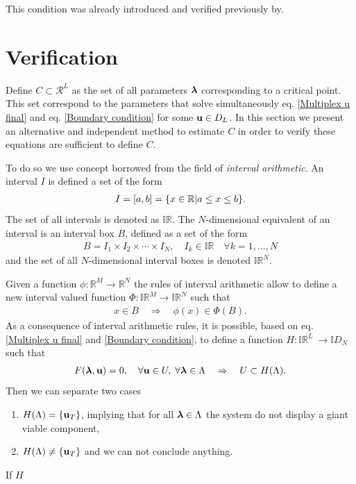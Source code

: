 \documentclass[a4paper]{article}
\begin{document}
This condition was already introduced and verified previously by\missingref{}.

\section{Verification}

Define $C \subset \mathcal{R}^L$ as the set of all parameters $\boldsymbol{\mathrm{\lambda}}$ corresponding to a critical point. This set correspond to the parameters that solve simultaneously eq. \eqref{Multiplex u final} and eq. \eqref{Boundary condition} for some $\boldsymbol{\mathrm{u}} \in D_L$. In this section we present an alternative and independent method to estimate $C$ in order to verify these equations are sufficient to define $C$.

To do so we use concept borrowed from the field of \emph{interval arithmetic}\missingref. An interval $I$ is defined a set of the form
\begin{align}
	I = \left[a, b\right] = \{x \in \mathbb{R} | a \leq x \leq b\}.
\end{align}
The set of all intervals is denoted as $\mathbb{IR}$. The $N$-dimensional equivalent of an interval is an interval box $B$, defined as a set of the form
\begin{align}
	B = I_1 \times I_2 \times \cdots \times I_N, \quad I_k \in \mathbb{IR} \quad \forall k = 1, \dots, N
\end{align}
and the set of all $N$-dimensional interval boxes is denoted $\mathbb{IR}^N$.

Given a function $\phi : \mathbb{R}^M \rightarrow \mathbb{R}^N$ the rules of interval arithmetic allow to define a new interval valued function $\Phi : \mathbb{IR}^M \rightarrow \mathbb{IR}^N$ such that
\begin{align}
	x \in B \quad \Rightarrow \quad \phi(x) \in \Phi(B).
\end{align}
As a consequence of interval arithmetic rules, it is possible, based on eq. \eqref{Multiplex u final} and \eqref{Boundary condition}, to define a function $H : \mathbb{IR}^L\ \rightarrow \mathbb{I}D_N$  such that
\begin{align}
	F(\boldsymbol{\mathrm{\lambda}}, \boldsymbol{\mathrm{u}}) = 0, \quad \forall \boldsymbol{\mathrm{u}} \in U,\; \forall \boldsymbol{\mathrm{\lambda}} \in \Lambda \quad \Rightarrow \quad U \subset H(\Lambda).
\end{align}
Then we can separate two cases
\begin{enumerate}
	\item $H(\Lambda) = \{\boldsymbol{\mathrm{u}}_T\}$, implying that for all $\boldsymbol{\mathrm{\lambda}} \in \Lambda$ the system do not display a giant viable component,
	\item $H(\Lambda) \neq \{\boldsymbol{\mathrm{u}}_T\}$ and we can not conclude anything.
\end{enumerate}

If $H$
\end{document}
